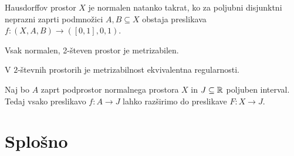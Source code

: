 \begin{izrek}
    Hausdorffov prostor $X$ je normalen natanko takrat, ko za poljubni disjunktni neprazni zaprti podmnožici $A, B \subseteq X$ obstaja preslikava $f :(X, A, B) \to ([0,1], 0, 1)$.
\end{izrek}

\begin{izrek}
    Vsak normalen, 2-števen prostor je metrizabilen.
\end{izrek}

\begin{posledica}
    V $2$-števnih prostorih je metrizabilnost ekvivalentna regularnosti.
\end{posledica}

\begin{izrek}
    Naj bo $A$ zaprt podprostor normalnega prostora $X$ in $J \subseteq \mathbb{R}$ poljuben interval. Tedaj vsako preslikavo $f: A \to J$ lahko razširimo do preslikave $F: X \to J$.
\end{izrek}



\section{Splošno}

